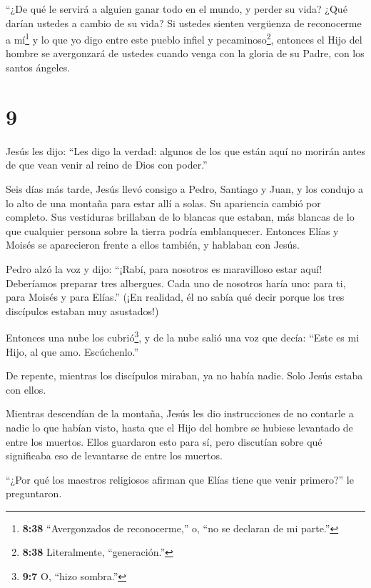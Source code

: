  ``¿De qué le servirá a alguien ganar todo en el mundo, y
perder su vida?  ¿Qué darían ustedes a cambio de su vida?
 Si ustedes sienten vergüenza de reconocerme a
mí\footnote{\textbf{8:38} ``Avergonzados de reconocerme,'' o, ``no se
  declaran de mi parte.''} y lo que yo digo entre este pueblo infiel y
pecaminoso\footnote{\textbf{8:38} Literalmente, ``generación.''},
entonces el Hijo del hombre se avergonzará de ustedes cuando venga con
la gloria de su Padre, con los santos ángeles.

\hypertarget{section-8}{%
\section{9}\label{section-8}}

 Jesús les dijo: ``Les digo la verdad: algunos de los que
están aquí no morirán antes de que vean venir al reino de Dios con
poder.''

 Seis días más tarde, Jesús llevó consigo a Pedro, Santiago
y Juan, y los condujo a lo alto de una montaña para estar allí a solas.
Su apariencia cambió por completo.  Sus vestiduras brillaban
de lo blancas que estaban, más blancas de lo que cualquier persona sobre
la tierra podría emblanquecer.  Entonces Elías y Moisés se
aparecieron frente a ellos también, y hablaban con Jesús.

 Pedro alzó la voz y dijo: ``¡Rabí, para nosotros es
maravilloso estar aquí! Deberíamos preparar tres albergues. Cada uno de
nosotros haría uno: para ti, para Moisés y para Elías.'' 
(¡En realidad, él no sabía qué decir porque los tres discípulos estaban
muy asustados!)

 Entonces una nube los cubrió\footnote{\textbf{9:7} O,
  ``hizo sombra.''}, y de la nube salió una voz que decía: ``Este es mi
Hijo, al que amo. Escúchenlo.''

 De repente, mientras los discípulos miraban, ya no había
nadie. Solo Jesús estaba con ellos.

 Mientras descendían de la montaña, Jesús les dio
instrucciones de no contarle a nadie lo que habían visto, hasta que el
Hijo del hombre se hubiese levantado de entre los muertos. 
Ellos guardaron esto para sí, pero discutían sobre qué significaba eso
de levantarse de entre los muertos.

 ``¿Por qué los maestros religiosos afirman que Elías tiene
que venir primero?'' le preguntaron.

